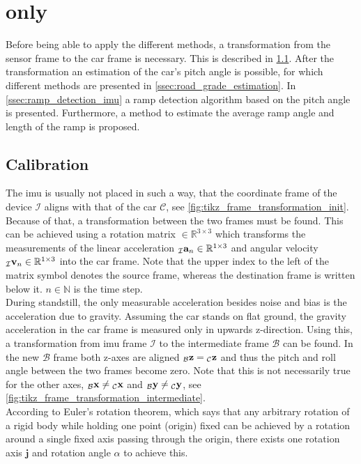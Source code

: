 \section{ only}
Before being able to apply the different methods, a transformation from the sensor frame to the car frame is necessary.
This is described in \cref{ssec:calibration_imu}.
After the transformation an estimation of the car's pitch angle is possible, for which different methods are presented in \cref{ssec:road_grade_estimation}.
In \cref{ssec:ramp_detection_imu} a ramp detection algorithm based on the pitch angle is presented.
Furthermore, a method to estimate the average ramp angle and length of the ramp is proposed.


\label{sec:methods_imu}
\subsection{Calibration}
\label{ssec:calibration_imu}
The \gls{imu} is usually not placed in such a way, that the coordinate frame of the device $\mathcal{I}$ aligns with that of the car $\mathcal{C}$, see \cref{fig:tikz_frame_transformation_init}.
Because of that, a transformation between the two frames must be found.
This can be achieved using a rotation matrix  $\in \mathbb{R}^{3\times3}$ which transforms the measurements of the linear acceleration $\vincs{a}{I}_n \in \mathbb{R}^{1\times3}$ and angular velocity ${\vincs{v}{I}_n \in \mathbb{R}^{1\times3}}$ into the car frame.
Note that the upper index to the left of the matrix symbol denotes the source frame, whereas the destination frame is written below it.
$n \in \mathbb{N}$ is the time step.\\
During standstill, the only measurable acceleration besides noise and bias is the acceleration due to gravity.
Assuming the car stands on flat ground, the gravity acceleration in the car frame is measured only in upwards z-direction.
Using this, a transformation from \gls{imu} frame $\mathcal{I}$ to the intermediate frame $\mathcal{B}$ can be found.
In the new $\mathcal{B}$ frame both z-axes are aligned $\vincs{z}{b} = \vincs{z}{c}$ and thus the pitch and roll angle between the two frames become zero.
Note that this is not necessarily true for the other axes, $\vincs{x}{b}\neq\vincs{x}{c}$ and $\vincs{y}{b}\neq\vincs{y}{c}$, see \cref{fig:tikz_frame_transformation_intermediate}.\\
According to Euler's rotation theorem, which says that any arbitrary rotation of a rigid body while holding one point (origin) fixed can be achieved by a rotation around a single fixed axis passing through the origin, there exists one rotation axis $\mathbf{j}$ and rotation angle $\alpha$ to achieve this.\\

